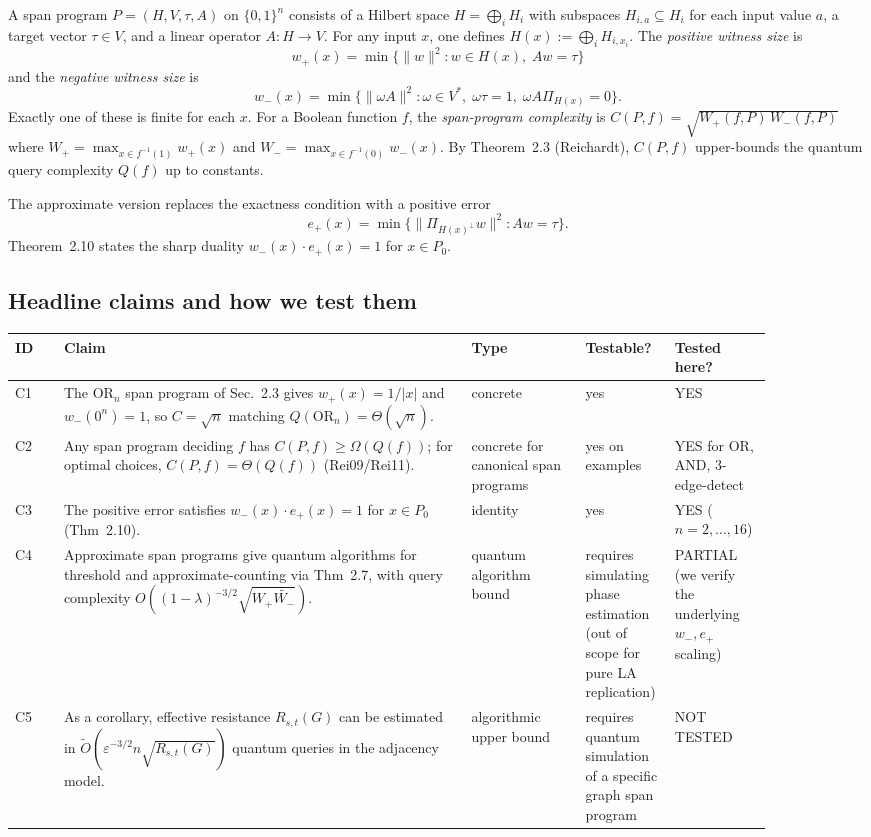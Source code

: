 \documentclass[11pt]{article}
\begin{document}
A span program $P = (H, V, \tau, A)$ on $\{0,1\}^n$ consists of a Hilbert space $H = \bigoplus_i H_i$ with subspaces $H_{i,a} \subseteq H_i$ for each input value $a$, a target vector $\tau \in V$, and a linear operator $A: H \to V$. For any input $x$, one defines $H(x) := \bigoplus_i H_{i, x_i}$. The \emph{positive witness size} is
\[
  w_+(x) = \min\{\|w\|^2 : w \in H(x),\; A w = \tau\}
\]
and the \emph{negative witness size} is
\[
  w_-(x) = \min\{\|\omega A\|^2 : \omega \in V^*,\; \omega \tau = 1,\; \omega A \Pi_{H(x)} = 0\}.
\]
Exactly one of these is finite for each $x$. For a Boolean function $f$, the \emph{span-program complexity} is $C(P,f) = \sqrt{W_+(f,P)\, W_-(f,P)}$ where $W_+ = \max_{x \in f^{-1}(1)} w_+(x)$ and $W_- = \max_{x \in f^{-1}(0)} w_-(x)$. By Theorem~2.3 (Reichardt), $C(P,f)$ upper-bounds the quantum query complexity $Q(f)$ up to constants.

The approximate version replaces the exactness condition with a positive error
\[
  e_+(x) = \min\{\|\Pi_{H(x)^\perp} w\|^2 : A w = \tau\}.
\]
Theorem~2.10 states the sharp duality $w_-(x) \cdot e_+(x) = 1$ for $x \in P_0$.

\subsection{Headline claims and how we test them}

\begin{center}
\begin{tabular}{@{}p{0.06\linewidth}p{0.5\linewidth}p{0.14\linewidth}p{0.09\linewidth}p{0.09\linewidth}@{}}
\toprule
ID & Claim & Type & Testable? & Tested here? \\ \midrule
C1 & The $\mathrm{OR}_n$ span program of Sec.~2.3 gives $w_+(x) = 1/|x|$ and $w_-(0^n) = 1$, so $C = \sqrt{n}$ matching $Q(\mathrm{OR}_n) = \Theta(\sqrt{n})$. & concrete & yes & YES \\
C2 & Any span program deciding $f$ has $C(P,f) \ge \Omega(Q(f))$; for optimal choices, $C(P,f) = \Theta(Q(f))$ (Rei09/Rei11). & concrete for canonical span programs & yes on examples & YES for OR, AND, 3-edge-detect \\
C3 & The positive error satisfies $w_-(x)\cdot e_+(x) = 1$ for $x \in P_0$ (Thm~2.10). & identity & yes & YES ($n{=}2,\dots,16$) \\
C4 & Approximate span programs give quantum algorithms for threshold and approximate-counting via Thm~2.7, with query complexity $O((1-\lambda)^{-3/2}\sqrt{W_+ \widetilde{W_-}})$. & quantum algorithm bound & requires simulating phase estimation (out of scope for pure LA replication) & PARTIAL (we verify the underlying $w_-, e_+$ scaling) \\
C5 & As a corollary, effective resistance $R_{s,t}(G)$ can be estimated in $\widetilde{O}(\varepsilon^{-3/2} n \sqrt{R_{s,t}(G)})$ quantum queries in the adjacency model. & algorithmic upper bound & requires quantum simulation of a specific graph span program & NOT TESTED \\
\bottomrule
\end{tabular}
\end{center}
\end{document}
